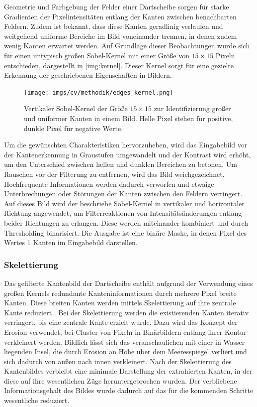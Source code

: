 Geometrie und Farbgebung der Felder einer Dartscheibe sorgen für starke Gradienten der Pixelintensitäten entlang der Kanten zwischen benachbarten Feldern. Zudem ist bekannt, dass diese Kanten geradlinig verlaufen und weitgehend uniforme Bereiche im Bild voneinander trennen, in denen zudem wenig Kanten erwartet werden. Auf Grundlage dieser Beobachtungen wurde sich für einen untypisch großen Sobel-Kernel mit einer Größe von $15 \times 15$ Pixeln entschieden, dargestellt in \autoref{img:kernel}. Dieser Kernel sorgt für eine gezielte Erkennung der geschriebenen Eigenschaften in Bildern.

\begin{figure}
    \centering
    \texttt{[image: imgs/cv/methodik/edges\_kernel.png]}
    \caption{Vertikaler Sobel-Kernel der Größe $15\times15$ zur Identifizierung großer und uniformer Kanten in einem Bild. Helle Pixel stehen für positive, dunkle Pixel für negative Werte.}
    \label{img:kernel}
\end{figure}

Um die gewünschten Charakteristiken hervorzuheben, wird das Eingabebild vor der Kantenerkennung in Graustufen umgewandelt und der Kontrast wird erhöht, um den Unterschied zwischen hellen und dunklen Bereichen zu betonen. Um Rauschen vor der Filterung zu entfernen, wird das Bild weichgezeichnet. Hochfrequente Informationen werden dadurch verworfen und etwaige Unterbrechungen oder Störungen der Kanten zwischen den Feldern verringert. Auf dieses Bild wird der beschriebe Sobel-Kernel in vertikaler und horizontaler Richtung angewendet, um Filterreaktionen von Intensitätsänderungen entlang beider Richtungen zu erlangen. Diese werden miteinander kombiniert und durch Thresholding binarisiert. Die Ausgabe ist eine binäre Maske, in denen Pixel des Wertes 1 Kanten im Eingabebild darstellen.

\subsubsection{Skelettierung}
\label{sec:skelettierung}

Das gefilterte Kantenbild der Dartscheibe enthält aufgrund der Verwendung eines großen Kernels redundante Kanteninformationen durch mehrere Pixel breite Kanten. Diese breiten Kanten werden mittels Skelettierung auf ihre zentrale Kante reduziert \cite{skeletonization}. Bei der Skelettierung werden die existierenden Kanten iterativ verringert, bis eine zentrale Kante erzielt wurde. Dazu wird das Konzept der Erosion verwendet, bei Cluster von Pixeln in Binärbildern entlang ihrer Kontur verkleinert werden. Bildlich lässt sich das veranschaulichen mit einer in Wasser liegenden Insel, die durch Erosion an Höhe über dem Meeresspiegel verliert und sich dadurch von außen nach innen verkleinert. Nach der Skelettierung des Kantenbildes verbleibt eine minimale Darstellung der extrahierten Kanten, in der diese auf ihre wesentlichen Züge heruntergebrochen wurden. Der verbliebene Informationsgehalt des Bildes wurde dadurch auf das für die kommenden Schritte wesentliche reduziert.

